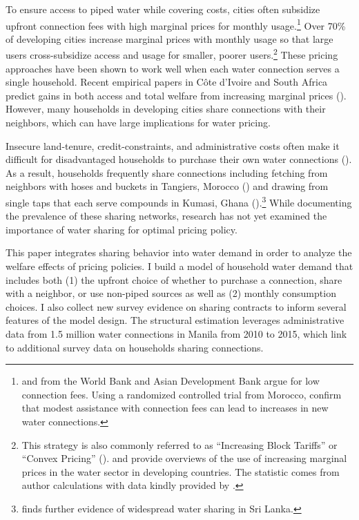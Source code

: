 \documentclass[12pt]{article}
\begin{document}
To ensure access to piped water while covering costs, cities often subsidize upfront connection fees with high marginal prices for monthly usage.\footnote{\cite{mcintosh2003asian} and \cite{komives2006distributional} from the World Bank and Asian Development Bank argue for low connection fees.  Using a randomized controlled trial from Morocco, \cite{devoto2012happiness} confirm that modest assistance with connection fees can lead to increases in new water connections.}  Over 70\% of developing cities increase marginal prices with monthly usage so that large users cross-subsidize access and usage for smaller, poorer users.\footnote{This strategy is also commonly referred to as ``Increasing Block Tariffs'' or  ``Convex Pricing'' (\cite{borenstein2012redistributional}). \cite{hoque2013state} and \cite{boland2000political} provide overviews of the use of increasing marginal prices in the water sector in developing countries.  The statistic comes from author calculations with data kindly provided by \cite{hoque2013state}.}  These pricing approaches have been shown to work well when each water connection serves a single household.  Recent empirical papers in C{\^o}te d'Ivoire and South Africa predict gains in both access and total welfare from increasing marginal prices (\cite{diakite2009proposal,szabo2015value}).  However, many households in developing cities share connections with their neighbors, which can have large implications for water pricing.  

Insecure land-tenure, credit-constraints, and administrative costs often make it difficult for disadvantaged households to purchase their own water connections (\cite{devoto2012happiness}).  As a result, households frequently share connections including fetching from neighbors with hoses and buckets in Tangiers, Morocco (\cite{devoto2012happiness}) and drawing from single taps that each serve compounds in Kumasi, Ghana (\cite{whittington1992possible}).\footnote{\cite{nauges2006water} finds further evidence of widespread water sharing in Sri Lanka.}  While documenting the prevalence of these  sharing networks, research has not yet examined the importance of water sharing for optimal pricing policy.  





This paper integrates sharing behavior into water demand in order to analyze the welfare effects of pricing policies.  I build a model of household water demand that includes both (1) the upfront choice of whether to purchase a connection, share with a neighbor, or use non-piped sources as well as (2) monthly consumption choices.  I also collect new survey evidence on sharing contracts to inform several features of the model design.  The structural estimation leverages administrative data from 1.5 million water connections in Manila from 2010 to 2015, which link to additional survey data on households sharing connections.  
\end{document}
